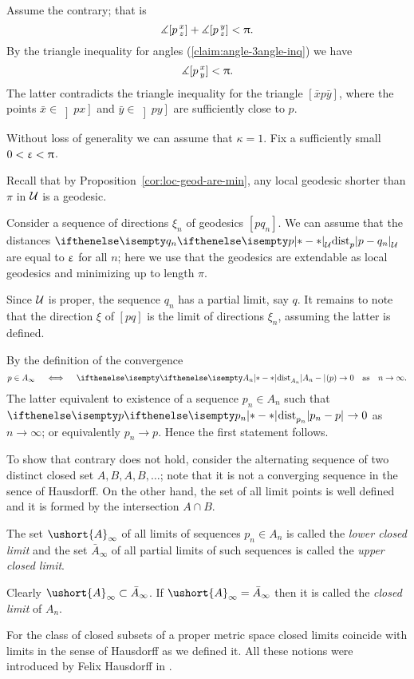 Assume the contrary; that is
\[\measuredangle[p\,{}^{x}_{z}]+\measuredangle[p\,{}^{y}_{z}]< \uppi.\]
By the  triangle inequality for angles (\ref{claim:angle-3angle-inq})
we have 
\[\measuredangle[p\,{}^{x}_{y}]<\uppi.\]
The latter contradicts the triangle inequality for the triangle $[\bar x p \bar y]$,
where the points
$\bar x\in \left]px\right]$ and $\bar y\in \left]py\right]$
are sufficiently close to $p$.\qeds


Without loss of generality we can assume that $\kappa=1$.
Fix a sufficiently small $0<\upvarepsilon<\uppi$.

Recall that by Proposition~\ref{cor:loc-geod-are-min}, any local geodesic shorter than $\pi$ in  $\mathcal{U}$ is a geodesic.

Consider a sequence of directions $\xi_n$ of geodesics $[pq_n]$.
We can assume that the distances $\dist{p}{q_n}{\spc{U}}$ are equal to $\upvarepsilon$ for all $n$;
here we use that the geodesics are extendable as local geodesics and minimizing up to length $\pi$.

Since $\mathcal{U}$ is proper,
the sequence $q_n$ has a partial limit, say $q$.
It remains to note that the direction $\xi$ of $[pq]$ is the limit of directions $\xi_n$,
assuming the latter is defined.\qeds

By the definition of the convergence
\[p\in A_\infty\quad\iff\quad\dist{A_n}{}{}(p)\to 0\quad\text{as}\quad n\to \infty.\] 
The latter equivalent to existence of a sequence $p_n\in A_n$ such that
$\dist{p_n}{p}{}\to0$ as $n\to \infty$;
or equivalently $p_n\to p$.
Hence the first statement follows.

To show that contrary does not hold,
consider the alternating sequence of two distinct closed set $A,B,A,B,\dots$;
note that it is not a converging sequence in the sence of Hausdorff.
On the other hand, the set of all limit points is well defined and it is formed by the intersection $A\cap B$.\qeds

 The set $\ushort{A}_\infty$ of all limits  of sequences $p_n\in A_n$ is called the \emph{lower closed limit}
and the set $\bar{A}_\infty$ of all partial limits of such sequences is called the \emph{upper closed limit}.

Clearly $\ushort{A}_\infty\subset \bar{A}_\infty$.
If $\ushort{A}_\infty=\bar{A}_\infty$ then it is called  the \emph{closed limit} of $A_n$.

For the class of closed subsets of a proper metric space closed limits coincide with limits in the sense of Hausdorff as we defined it.
All these notions were introduced by Felix Hausdorff in \cite{hausdorff}.



